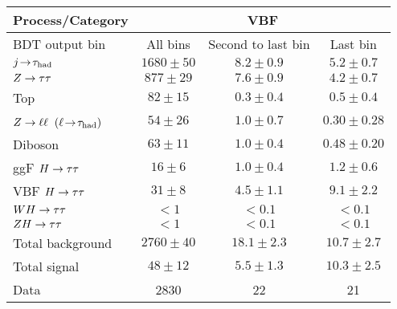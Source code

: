 \begin{tabular}{l|ccc}
  Process/Category  & \multicolumn{3}{c}{VBF} \\
  \hline
  BDT output bin    & All bins      & Second to last bin & Last bin    \\
  \hline
  $j\!\rightarrow\!\tau_\text{had}$          & $1680 \pm 50$ & $ 8.2 \pm 0.9$ & $5.2  \pm 0.7$  \\
  $Z\rightarrow\tau\tau$        & $ 877 \pm 29$ & $ 7.6 \pm 0.9$ & $4.2  \pm 0.7$  \\
  Top               & $  82 \pm 15$ & $ 0.3 \pm 0.4$ & $0.5  \pm 0.4$  \\
  $Z \rightarrow \ell\ell$ $(\ell\!\rightarrow\!\tau_\text{had})$ & $  54 \pm 26$ & $ 1.0 \pm 0.7$ & $0.30 \pm 0.28$ \\
  Diboson           & $  63 \pm 11$ & $ 1.0 \pm 0.4$ & $0.48 \pm 0.20$ \\
  \hline
  ggF $H\rightarrow\tau\tau$    & $  16 \pm 6$  & $ 1.0 \pm 0.4$ & $1.2  \pm 0.6$  \\
  VBF $H\rightarrow\tau\tau$    & $  31 \pm 8$  & $ 4.5 \pm 1.1$ & $9.1  \pm 2.2$  \\
  $WH\rightarrow\tau\tau$       & $ < 1$        & $< 0.1$        & $< 0.1$         \\
  $ZH\rightarrow\tau\tau$       & $ < 1$        & $< 0.1$        & $< 0.1$         \\
  \hline
  Total background  & $2760 \pm 40$ & $18.1 \pm 2.3$ & $10.7 \pm 2.7$  \\
  Total signal      & $  48 \pm 12$ & $ 5.5 \pm 1.3$ & $10.3 \pm 2.5$  \\
  \hline
  Data              & 2830          & 22             & 21             \\
\end{tabular}


